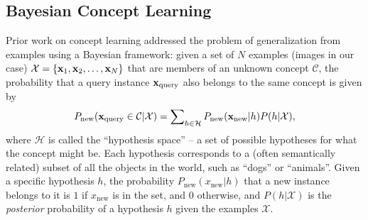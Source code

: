 \subsection{Bayesian Concept Learning}
Prior work on concept learning \cite{xu2007word} addressed the problem of generalization from examples using a Bayesian framework: given a set of $N$ examples (images in our case) $\mathcal{X} = \{ \mathbf{x}_1, \mathbf{x}_2,\ldots, \mathbf{x}_N \}$ that are members of an unknown concept $\mathcal{C}$, the probability that a query instance $\mathbf{x}_\mathrm{query}$ also belongs to the same concept is given by
\begin{equation}
P_{\mathrm{new}}(\mathbf{x}_\mathrm{query} \in \mathcal{C}|\mathcal{X}) = \sum\nolimits_{h \in \mathcal{H}} P_{\mathrm{new}}(\mathbf{x}_\mathrm{new} | h)P(h|\mathcal{X}), \label{eq:bayeswl}
\end{equation}
where $\mathcal{H}$ is called the ``hypothesis space'' -- a set of possible hypotheses for what the concept might be. Each hypothesis corresponds to a (often semantically related) subset of all the objects in the world, such as ``dogs'' or ``animals''. Given a specific hypothesis $h$, the probability $P_{\mathrm{new}}(x_\mathrm{new}|h)$ that a new instance belongs to it is $1$ if $x_\mathrm{new}$ is in the set, and $0$ otherwise, and $P(h | \mathcal{X})$ is the \emph{posterior} probability of a hypothesis $h$ given the examples $\mathcal{X}$.

